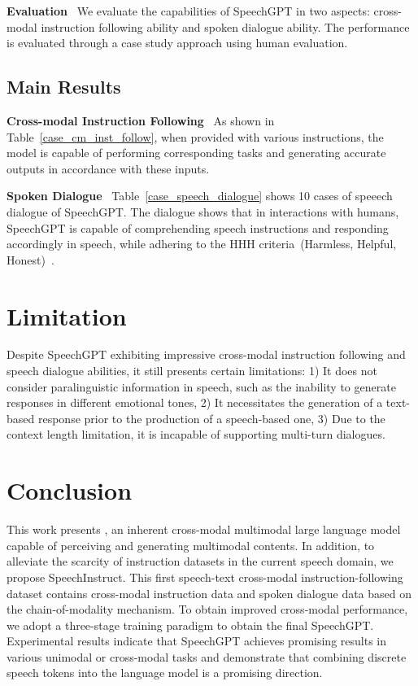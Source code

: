 \noindent\textbf{Evaluation}~
We evaluate the capabilities of SpeechGPT in two aspects: cross-modal instruction following ability and spoken dialogue ability. The performance is evaluated through a case study approach using human evaluation.

\subsection{Main Results}
\label{sec:03_data}

\noindent\textbf{Cross-modal Instruction Following}~
As shown in Table~\ref{case_cm_inst_follow}, when provided with various instructions, the model is capable of performing corresponding tasks and generating accurate outputs in accordance with these inputs.

\noindent\textbf{Spoken Dialogue}~
Table~\ref{case_speech_dialogue} shows 10 cases of speeech dialogue of SpeechGPT. The dialogue shows that in interactions with humans, SpeechGPT is capable of comprehending speech instructions and responding accordingly in speech, while adhering to the HHH criteria~(Harmless, Helpful, Honest)~\citep{askell2021general}.

\section{Limitation}
Despite SpeechGPT exhibiting impressive cross-modal instruction following and speech dialogue abilities, it still presents certain limitations: 1) It does not consider paralinguistic information in speech, such as the inability to generate responses in different emotional tones, 2) It necessitates the generation of a text-based response prior to the production of a speech-based one, 3) Due to the context length limitation, it is incapable of supporting multi-turn dialogues.

\section{Conclusion}

This work presents \method, an inherent cross-modal multimodal large language model capable of perceiving and generating multimodal contents. In addition, to alleviate the scarcity of instruction datasets in the current speech domain, we propose SpeechInstruct. This first speech-text cross-modal instruction-following dataset contains cross-modal instruction data and spoken dialogue data based on the chain-of-modality mechanism. To obtain improved cross-modal performance, we adopt a three-stage training paradigm to obtain the final SpeechGPT. Experimental results indicate that SpeechGPT achieves promising results in various unimodal or cross-modal tasks and demonstrate that combining discrete speech tokens into the language model is a promising direction.

\clearpage

